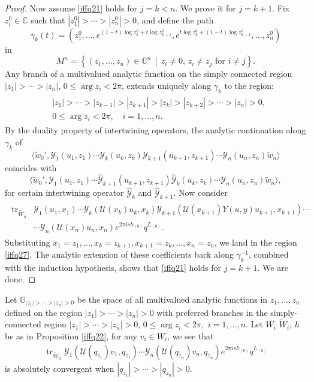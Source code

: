 \documentclass[9pt]{amsart}
\newcommand{\Y}{\mathcal{Y}}
\begin{document}
\begin{proof}
Now assume \eqref{iffq21} holds for \( j=k < n \). We prove it for \( j = k+1 \). Fix \( z_i^0 \in \mathbb{C} \) such that \( |z_1^0| > \cdots > |z_n^0| > 0 \), and define the path
\[
\gamma_k(t) = \left( z_1^0, \ldots, e^{(1-t)\log z_k^0 + t \log z_{k+1}^0}, e^{t \log z_k^0 + (1 - t) \log z_{k+1}^0}, \ldots, z_n^0 \right)
\]
in
\[
M^n = \left\{ (z_1, \ldots, z_n) \in \mathbb{C}^n \,\middle|\, z_i \neq 0,\, z_i \neq z_j \text{ for } i \neq j \right\}.
\]
Any branch of a multivalued analytic function on the simply connected region \( |z_1| > \cdots > |z_n| \), \( 0 \leq \arg z_i < 2\pi \), extends uniquely along \( \gamma_k \) to the region:
\begin{align}\label{iffq27}
\begin{split}
&|z_1| > \cdots > |z_{k-1}| > |z_{k+1}| > |z_k| > |z_{k+2}| > \cdots > |z_n| > 0, \\
&0 \leq \arg z_i < 2\pi, \quad i = 1, \ldots, n.
\end{split}
\end{align}
By the duality property of intertwining operators, the analytic continuation along \( \gamma_k \) of
\[
\langle \tilde{w}_0', \mathcal{Y}_1(u_1, z_1) \cdots \mathcal{Y}_k(u_k, z_k) \mathcal{Y}_{k+1}(u_{k+1}, z_{k+1}) \cdots \mathcal{Y}_n(u_n, z_n) \tilde{w}_n \rangle
\]
coincides with
\[
\langle \tilde{w}_0', \mathcal{Y}_1(u_1, z_1) \cdots \hat{\mathcal{Y}}_{k+1}(u_{k+1}, z_{k+1}) \hat{\mathcal{Y}}_k(u_k, z_k) \cdots {\mathcal{Y}}_n(u_n, z_n) \tilde{w}_n \rangle,
\] for certain intertwining operator $\hat{\mathcal{Y}}_k$ and $\hat{\mathcal{Y}}_{k+1}$. 
Now consider
\begin{align}\label{iffq28}
\begin{split}
\operatorname{tr}_{\tilde{W}_n} &\mathcal{Y}_1(u_1, x_1) \cdots \mathcal{Y}_k(\mathcal{U}(x_k) u_k, x_k) \mathcal{Y}_{k+1}(\mathcal{U}(x_{k+1}) Y(u, y) u_{k+1}, x_{k+1}) \cdots \\
&\cdots \mathcal{Y}_n(\mathcal{U}(x_n) u_n, x_n) e^{2\pi i s h_{(0)}} q^{L_{(0)}}.
\end{split}
\end{align}
Substituting \( x_1 = z_1, \ldots, x_k = z_{k+1}, x_{k+1} = z_k, \ldots, x_n = z_n \), we land in the region \eqref{iffq27}. The analytic extension of these coefficients back along \( \gamma_k^{-1} \), combined with the induction hypothesis, shows that \eqref{iffq21} holds for \( j = k+1 \). We are done.

\end{proof}

Let $\mathbb{G}_{|z_{1}|>\cdots>|z_{n}|>0}$ be the space of all multivalued analytic functions in $z_{1},...,z_{n}$ defined on the region $|z_{1}|>\cdots>|z_{n}|>0$ with preferred branches in the simply-connected region $|z_{1}|>\cdots>|z_{n}|>0$, $0\leq \operatorname{arg}z_{i}<2\pi,$ $i=1,...,n$.
Let $W_i$ $\tilde{W}_i$, $h$ be as in Proposition \ref{iffq22}, for any $v_i\in W_i$, we see that
\begin{align*}
     \operatorname{tr}_{\tilde{W}_n}\Y_1(\mathcal{U}(q_{z_{1}})v_{1},q_{z_{1}})\cdots \Y_n(\mathcal{U}(q_{z_{n}})v_{n},q_{z_{n}})e^{2\pi i s h_{(0)}}q^{L_{(0)}}
\end{align*}
is absolutely convergent when $|q_{z_{1}}|>\cdots>|q_{z_{n}}|>0$.
\end{document}
